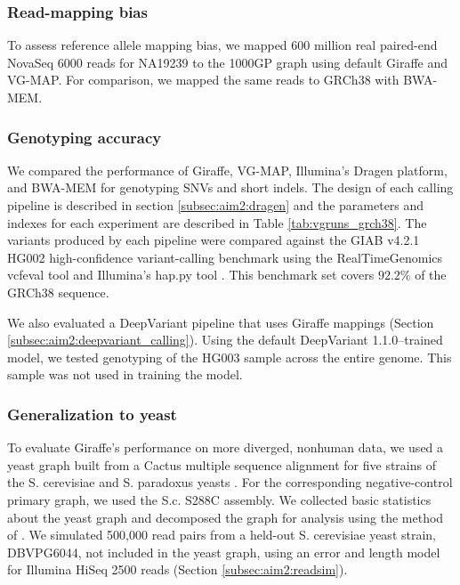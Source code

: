 \documentclass[11pt]{ucscthesis}
\begin{document}
\subsubsection{Read-mapping bias}
To assess reference allele mapping bias, we mapped 600 million real paired-end NovaSeq 6000 reads for NA19239 to the 1000GP graph using default Giraffe and VG-MAP.
For comparison, we mapped the same reads to GRCh38 with BWA-MEM.

\subsubsection{Genotyping accuracy}
\label{subsec:aim2:genotyping-accuracy-methods}
We compared the performance of Giraffe, VG-MAP, Illumina’s Dragen platform, and BWA-MEM for genotyping SNVs and short indels.
The design of each calling pipeline is described in section \ref{subsec:aim2:dragen} and the parameters and indexes for each experiment are described in Table \ref{tab:vgruns_grch38}.
The variants produced by each pipeline were compared against the GIAB v4.2.1 HG002 high-confidence variant-calling benchmark \cite{wagner_benchmarking_2020} using the RealTimeGenomics vcfeval tool \cite{cleary2015comparing} and Illumina’s hap.py tool \cite{happy_2020}.
This benchmark set covers $92.2\%$ of the GRCh38 sequence.

We also evaluated a DeepVariant \cite{deep_variant_2018} pipeline that uses Giraffe mappings (Section \ref{subsec:aim2:deepvariant_calling}).
Using the default DeepVariant 1.1.0–trained model, we tested genotyping of the HG003 sample across the entire genome.
This sample was not used in training the model.

\subsubsection{Generalization to yeast}
\label{subsec:aim2:yeast-methods}
To evaluate Giraffe’s performance on more diverged, nonhuman data, we used a yeast graph built from a Cactus multiple sequence alignment for five strains of the S. cerevisiae and S. paradoxus yeasts \cite{hickey_vgsv_2020}.
For the corresponding negative-control primary graph, we used the S.c. S288C assembly.
We collected basic statistics about the yeast graph and decomposed the graph for analysis using the method of \cite{paten_superbubbles_2018}.
We simulated 500,000 read pairs from a held-out S. cerevisiae yeast strain, DBVPG6044, not included in the yeast graph, using an error and length model for Illumina HiSeq 2500 reads (Section \ref{subsec:aim2:readsim}).
\end{document}
